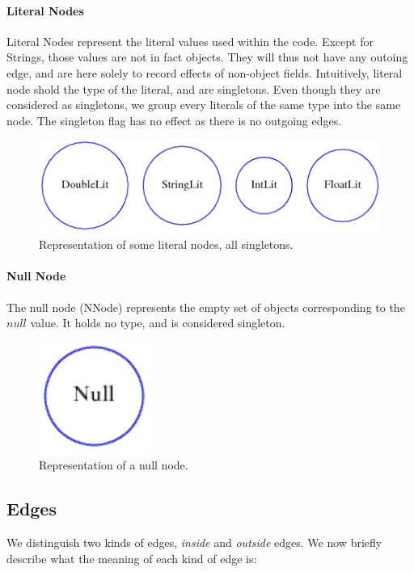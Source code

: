 \paragraph{Literal Nodes} Literal Nodes represent the literal values used
within the code. Except for Strings, those values are not in fact objects.
They will thus not have any outoing edge, and are here solely to record effects
of non-object fields. Intuitively, literal node shold the type of the literal,
and are singletons. Even though they are considered as singletons, we group
every literals of the same type into the same node. The singleton flag has no
effect as there is no outgoing edges.

\begin{figure}[h]
    \centering

    \includegraphics{images/pt_litnodes}

    \caption{Representation of some literal nodes, all singletons.}
    \label{fig:pt:litnodes}
\end{figure}


\paragraph{Null Node} The null node (NNode) represents the empty set of objects
corresponding to the $null$ value. It holds no type, and is considered singleton.

\begin{figure}[h]
    \centering

    \includegraphics{images/pt_nnodes}

    \caption{Representation of a null node.}
    \label{fig:pt:nnodes}
\end{figure}

\subsection{Edges}
We distinguish two kinds of edges, \emph{inside} and \emph{outside} edges. We now
briefly describe what the meaning of each kind of edge is:

